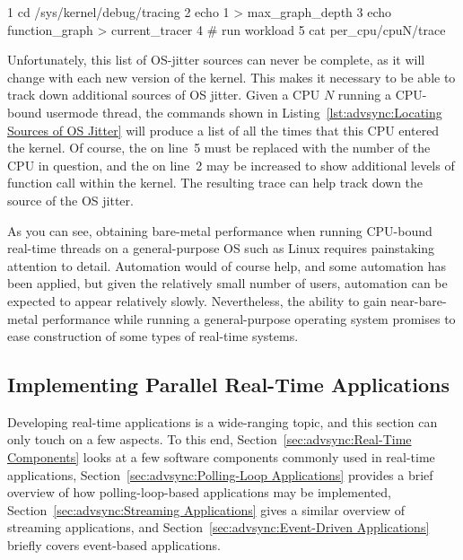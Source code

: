 \begin{listing}[tb]
{ \scriptsize
\begin{verbbox}
 1 cd /sys/kernel/debug/tracing
 2 echo 1 > max_graph_depth
 3 echo function_graph > current_tracer
 4 # run workload
 5 cat per_cpu/cpuN/trace
\end{verbbox}
}
\centering
\theverbbox
\caption{Locating Sources of OS Jitter}
\label{lst:advsync:Locating Sources of OS Jitter}
\end{listing}

Unfortunately, this list of OS-jitter sources can never be complete,
as it will change with each new version of the kernel.
This makes it necessary to be able to track down additional sources
of OS jitter.
Given a CPU $N$ running a CPU-bound usermode thread, the
commands shown in
Listing~\ref{lst:advsync:Locating Sources of OS Jitter}
will produce a list of all the times that this CPU entered the kernel.
Of course, the  on line~5 must be replaced with the
number of the CPU in question, and the  on line~2 may be increased
to show additional levels of function call within the kernel.
The resulting trace can help track down the source of the OS jitter.

As you can see, obtaining bare-metal performance when running
CPU-bound real-time threads on a general-purpose OS such as Linux
requires painstaking attention to detail.
Automation would of course help, and some automation has been applied,
but given the relatively small number of users, automation can be
expected to appear relatively slowly.
Nevertheless, the ability to gain near-bare-metal performance while
running a general-purpose operating system promises to ease construction
of some types of real-time systems.

\subsection{Implementing Parallel Real-Time Applications}
\label{sec:advsync:Implementing Parallel Real-Time Applications}

Developing real-time applications is a wide-ranging topic, and this
section can only touch on a few aspects.
To this end,
Section~\ref{sec:advsync:Real-Time Components}
looks at a few software components commonly used in real-time applications,
Section~\ref{sec:advsync:Polling-Loop Applications}
provides a brief overview of how polling-loop-based applications may
be implemented,
Section~\ref{sec:advsync:Streaming Applications}
gives a similar overview of streaming applications, and
Section~\ref{sec:advsync:Event-Driven Applications}
briefly covers event-based applications.

